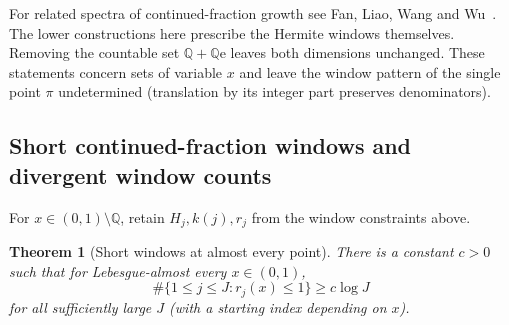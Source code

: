 \documentclass[11pt]{article}
\newtheorem{theorem}{Theorem}
\theoremstyle{definition}
\theoremstyle{remark}
\newcommand{\Q}{\mathbb{Q}}
\newcommand{\ee}{\mathrm{e}}
\begin{document}
For related spectra of continued-fraction growth see Fan, Liao, Wang
and Wu~\cite{FLLW}. The lower constructions here prescribe the
Hermite windows themselves. Removing the countable set $\Q+\Q\ee$
leaves both dimensions unchanged. These statements concern sets of
variable $x$ and leave the window pattern of the single point $\pi$
undetermined (translation by its integer part preserves denominators).

\subsection{Short continued-fraction windows and divergent window counts}

For $x\in(0,1)\setminus\Q$, retain $H_j,k(j),r_j$ from the window
constraints above.

\begin{theorem}[Short windows at almost every point]\label{thm:short-ae}
There is a constant $c>0$ such that for Lebesgue-almost every $x\in(0,1)$,
\[
 \#\{1\le j\le J:r_j(x)\le1\}\ge c\log J
\]
for all sufficiently large $J$ (with a starting index depending on $x$).
\end{theorem}
\end{document}
